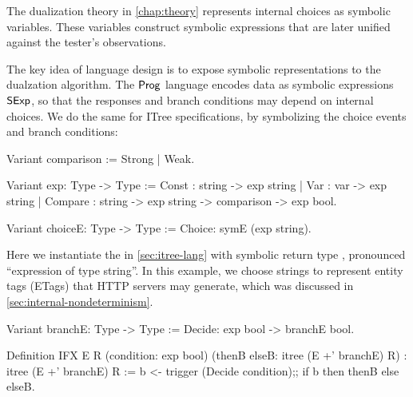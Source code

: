 The dualization theory in \autoref{chap:theory} represents internal choices as
symbolic variables.  These variables construct symbolic expressions that are
later unified against the tester's observations.

The key idea of language design is to expose symbolic representations to the
dualzation algorithm.  The $\mathsf{Prog}$ language encodes data as symbolic expressions
$\mathsf{SExp}$, so that the responses and branch conditions may depend on internal
choices.  We do the same for ITree specifications, by symbolizing the choice
events and branch conditions:
\begin{coq}
  Variant comparison := Strong | Weak.

  Variant exp: Type -> Type :=
    Const   : string -> exp string
  | Var     : var    -> exp string
  | Compare : string -> exp string -> comparison -> exp bool.

  Variant choiceE: Type -> Type :=
    Choice: symE (exp string).
\end{coq}

Here we instantiate the  in \autoref{sec:itree-lang} with symbolic
return type , pronounced ``expression of type string''.  In
this example, we choose strings to represent entity tags (ETags) that HTTP
servers may generate, which was discussed in
\autoref{sec:internal-nondeterminism}.

\begin{coq}
  Variant branchE: Type -> Type :=
    Decide: exp bool -> branchE bool.

  Definition IFX {E R} (condition: exp bool)
                       (thenB elseB: itree (E +' branchE) R)
                       : itree (E +' branchE) R :=
    b <- trigger (Decide condition);;
    if b then thenB else elseB.
\end{coq}
